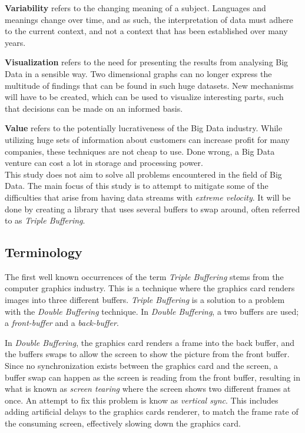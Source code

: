 \documentclass[a4paper]{article}
\begin{document}
\textbf{Variability} refers to the changing meaning of a subject. Languages and meanings change over time, and as such, the interpretation of data must adhere to the current context, and not a context that has been established over many years.

\textbf{Visualization} refers to the need for presenting the results from analysing Big Data in a sensible way. Two dimensional graphs can no longer express the multitude of findings that can be found in such huge datasets. New mechanisms will have to be created, which can be used to visualize interesting parts, such that decisions can be made on an informed basis.

\textbf{Value} refers to the potentially lucrativeness of the Big Data industry. While utilizing huge sets of information about customers can increase profit for many companies, these techniques are not cheap to use. Done wrong, a Big Data venture can cost a lot in storage and processing power.\\


This study does not aim to solve all problems encountered in the field of Big Data. The main focus of this study is to attempt to mitigate some of the difficulties that arise from having data streams with \textit{extreme velocity}. It will be done by creating a  library that uses several buffers to swap around, often referred to as \textit{Triple Buffering}.


\subsection{Terminology}
The first well known occurrences of the term \textit{Triple Buffering} stems from the computer graphics industry\cite{3buf}. This is a technique where the graphics card renders images into three different buffers. \textit{Triple Buffering} is a solution to a problem with the \textit{Double Buffering} technique. In \textit{Double Buffering}, a two buffers are used; a \textit{front-buffer} and a \textit{back-buffer}. 

In \textit{Double Buffering}, the graphics card renders a frame into the back buffer, and the buffers swaps to allow the screen to show the picture from the front buffer. Since no synchronization exists between the graphics card and the screen, a buffer swap can happen as the screen is reading from the front buffer, resulting in what is known as \textit{screen tearing} where the screen shows two different frames at once. An attempt to fix this problem is know as \textit{vertical sync}. This includes adding artificial delays to the graphics cards renderer, to match the frame rate of the consuming screen, effectively slowing down the graphics card.
\end{document}
